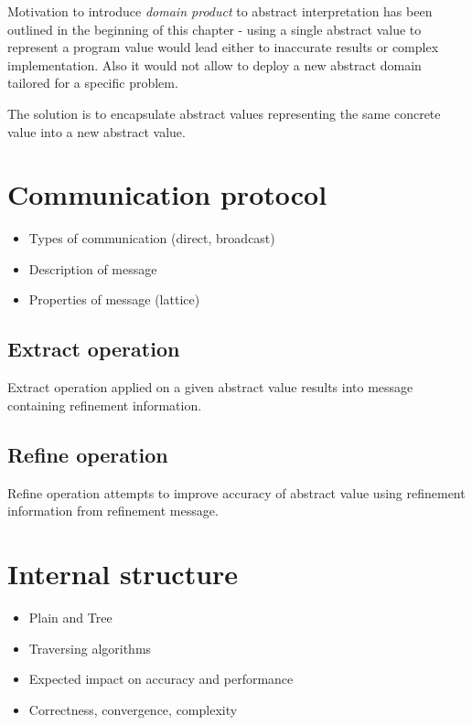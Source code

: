\documentclass[12pt,oneside]{fithesis2}
\theoremstyle{definition}
\begin{document}
Motivation to introduce \textit{domain product} to abstract interpretation has been outlined in the beginning of this chapter - using a single abstract value to represent a program value would lead either to inaccurate results or complex implementation. Also it would not allow to deploy a new abstract domain tailored for a specific problem. \cite{CousotEtAl06-ASIAN}

The solution is to encapsulate abstract values representing the same concrete value into a new abstract value.

\section{Communication protocol}
\begin{itemize}
  \item Types of communication (direct, broadcast)
  \item Description of message
  \item Properties of message (lattice)
\end{itemize}

\subsection{Extract operation}

Extract operation applied on a given abstract value results into message containing refinement information.

\subsection{Refine operation}

Refine operation attempts to improve accuracy of abstract value using refinement information from refinement message.

\section{Internal structure}
\begin{itemize}
  \item Plain and Tree
  \item Traversing algorithms
  \item Expected impact on accuracy and performance
  \item Correctness, convergence, complexity
\end{itemize}
\end{document}

